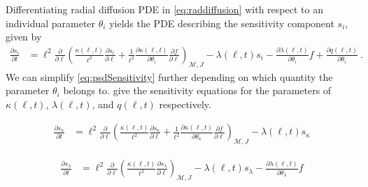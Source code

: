 Differentiating radial diffusion PDE in \cref{eq:raddiffusion} with respect to an individual 
parameter $\theta_i$ yields the PDE describing the sensitivity component $s_i$, given by 
\begin{equation}\label{eq:psdSensitivity}
    \begin{aligned}
        \frac{\partial{s_i}}{\partial{t}} &= \ell^2 \frac{\partial}{\partial{\ell}} \left( 
            \frac{\kappa(\ell, t)}{\ell^{2}} \frac{\partial{s_i}}{\partial{\ell}} +
            \frac{1}{\ell^{2}} \frac{\partial{\kappa(\ell, t)}}{\partial{\theta_i}} 
            \frac{\partial{f}}{\partial{\ell}}
        \right)_{\mathcal{M}, J}
         - \lambda(\ell, t) s_i - \frac{\partial{\lambda}(\ell, t)}{\partial{\theta_i}} f
         + \frac{\partial{q}(\ell, t)}{\partial{\theta_i}} \ .
    \end{aligned}
\end{equation}
We can simplify \cref{eq:psdSensitivity} further depending on which quantity the parameter 
$\theta_i$ belongs to.  
give the sensitivity equations for the parameters of $\kappa(\ell, t)$, $\lambda(\ell, t)$, and 
$q(\ell, t)$ respectively.

\begin{equation}\label{eq:psdSensitivityDiff}
    \begin{aligned}
        \frac{\partial{s_{\kappa}}}{\partial{t}} &= \ell^2 \frac{\partial}{\partial{\ell}} \left( 
            \frac{\kappa(\ell, t)}{\ell^{2}} \frac{\partial{s_{\kappa}}}{\partial{\ell}} +
            \frac{1}{\ell^{2}} \frac{\partial{\kappa(\ell, t)}}{\partial{\theta_{\kappa}}} 
            \frac{\partial{f}}{\partial{\ell}}
        \right)_{\mathcal{M}, J}
         - \lambda(\ell, t) s_{\kappa}
    \end{aligned}
\end{equation}

\begin{equation}\label{eq:psdSensitivityLambda}
    \begin{aligned}
        \frac{\partial{s_{\lambda}}}{\partial{t}} &= \ell^2 \frac{\partial}{\partial{\ell}} \left( 
            \frac{\kappa(\ell, t)}{\ell^{2}} \frac{\partial{s_{\lambda}}}{\partial{\ell}} 
        \right)_{\mathcal{M}, J}
         - \lambda(\ell, t) s_{\lambda}
         - \frac{\partial\lambda(\ell, t)}{\partial{\theta_{\lambda}}} f
    \end{aligned}
\end{equation}

